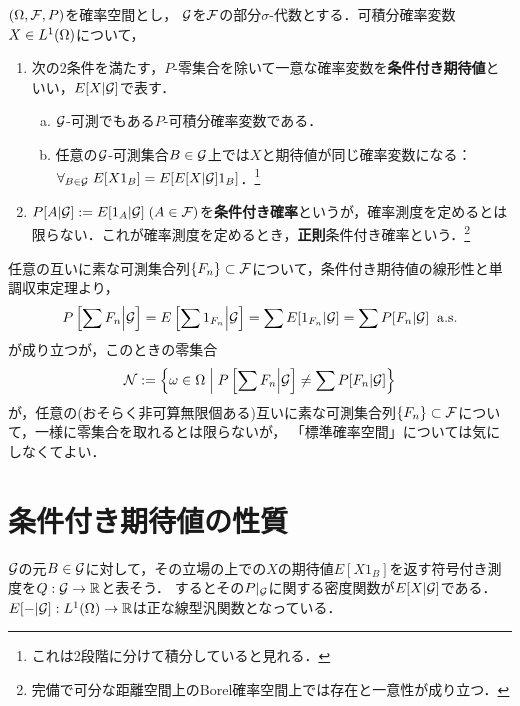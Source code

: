 \documentclass[uplatex,dvipdfmx]{jsreport}
\begin{document}
\begin{definition}
    $(\Omega,\mathcal{F},P)$を確率空間とし，
    $\mathcal{G}$を$\mathcal{F}$の部分$\sigma$-代数とする．可積分確率変数$X\in L^1(\Omega)$について，
    \begin{enumerate}
        \item 次の2条件を満たす，$P$-零集合を除いて一意な確率変数を\textbf{条件付き期待値}といい，$E[X|\mathcal{G}]$で表す．
        \begin{enumerate}[(a)]
            \item $\mathcal{G}$-可測でもある$P$-可積分確率変数である．
            \item 任意の$\mathcal{G}$-可測集合$B\in\mathcal{G}$上では$X$と期待値が同じ確率変数になる：
            $\forall_{B\in\mathcal{G}}\;E[X1_B]=E[E[X|\mathcal{G}]1_B]$．\footnote{これは2段階に分けて積分していると見れる．}
        \end{enumerate}
        \item $P[A|\mathcal{G}]:=E[1_A|\mathcal{G}]\;(A\in\mathcal{F})$を\textbf{条件付き確率}というが，確率測度を定めるとは限らない．これが確率測度を定めるとき，\textbf{正則}条件付き確率という．\footnote{完備で可分な距離空間上のBorel確率空間上では存在と一意性が成り立つ．}
    \end{enumerate}
\end{definition}
\begin{remark}[正則条件付き確率]
    任意の互いに素な可測集合列$\{F_n\}\subset\mathcal{F}$について，条件付き期待値の線形性と単調収束定理より，
    \[P\left[\sum F_n\middle|\mathcal{G}\right]=E\left[\sum 1_{F_n}\middle|\mathcal{G}\right]=\sum E[1_{F_n}|\mathcal{G}]=\sum P[F_n|\mathcal{G}]\;\;\mathrm{a.s.}\]
    が成り立つが，このときの零集合
    \[\mathcal{N}:=\left\{\omega\in\Omega\;\middle|\;P\left[\sum F_n\middle|\mathcal{G}\right]\ne \sum P[F_n|\mathcal{G}]\right\}\]
    が，任意の(おそらく非可算無限個ある)互いに素な可測集合列$\{F_n\}\subset\mathcal{F}$について，一様に零集合を取れるとは限らないが，
    「標準確率空間」については気にしなくてよい．
\end{remark}

\section{条件付き期待値の性質}

\begin{tcolorbox}[colframe=ForestGreen, colback=ForestGreen!10!white,breakable,colbacktitle=ForestGreen!40!white,coltitle=black,fonttitle=\bfseries\sffamily,
title=]
    $\mathcal{G}$の元$B\in\mathcal{G}$に対して，その立場の上での$X$の期待値$E[X1_B]$を返す符号付き測度を$Q:\mathcal{G}\to\mathbb{R}$と表そう．
    するとその$P|_{\mathcal{G}}$に関する密度関数が$E[X|\mathcal{G}]$である．
    $E[-|\mathcal{G}]:L^1(\Omega)\to\mathbb{R}$は正な線型汎関数となっている．
\end{tcolorbox}
\end{document}
